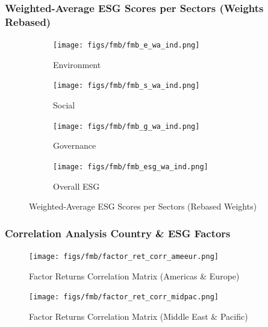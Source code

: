 \documentclass[11pt,a4paper]{article}
\begin{document}
\subsubsection{Weighted-Average ESG Scores per Sectors (Weights Rebased)}

\begin{figure}[h!]
    \begin{subfigure}{0.5\textwidth}
        \texttt{[image: figs/fmb/fmb\_e\_wa\_ind.png]}
        \caption{Environment}
        \label{fig:fmb_e_wa_ind}
    \end{subfigure}
    \hfill
    \begin{subfigure}{0.5\textwidth}
        \texttt{[image: figs/fmb/fmb\_s\_wa\_ind.png]}
        \caption{Social}
        \label{fig:fmb_s_wa_ind}
    \end{subfigure}
    \medskip
    \begin{subfigure}{0.5\textwidth}
        \texttt{[image: figs/fmb/fmb\_g\_wa\_ind.png]}
        \caption{Governance}
        \label{fig:fmb_g_wa_ind}
    \end{subfigure}
    \hfill
    \begin{subfigure}{0.5\textwidth}
        \texttt{[image: figs/fmb/fmb\_esg\_wa\_ind.png]}
        \caption{Overall ESG}
        \label{fig:fmb_esg_wa_ind}
    \end{subfigure}
    \caption{Weighted-Average ESG Scores per Sectors (Rebased Weights)}
    \label{Label}
   
   \end{figure}

\clearpage

\subsubsection{Correlation Analysis Country \& ESG Factors}\label{appendix:corr_country_esg}

\begin{figure}[h!] 
    \centering
    \texttt{[image: figs/fmb/factor\_ret\_corr\_ameeur.png]} 
    \caption{Factor Returns Correlation Matrix (Americas \& Europe)}
    \label{fig:fmb_factor_ret_corr_ameeur}
\end{figure}

\clearpage

\begin{figure}[h!] 
    \centering
    \texttt{[image: figs/fmb/factor\_ret\_corr\_midpac.png]} 
    \caption{Factor Returns Correlation Matrix (Middle East \& Pacific)}
    \label{fig:fmb_factor_ret_corr_midpac}
\end{figure}
\end{document}
